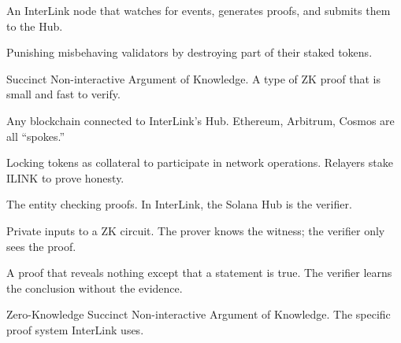 \documentclass[11pt,a4paper]{article}
\begin{document}
\begin{description}[style=nextline, leftmargin=3cm, labelwidth=2.8cm]
\item[Relayer] An InterLink node that watches for events, generates proofs, and submits them to the Hub.

\item[Slashing] Punishing misbehaving validators by destroying part of their staked tokens.

\item[SNARK] Succinct Non-interactive Argument of Knowledge. A type of ZK proof that is small and fast to verify.

\item[Spoke] Any blockchain connected to InterLink's Hub. Ethereum, Arbitrum, Cosmos are all ``spokes.''

\item[Staking] Locking tokens as collateral to participate in network operations. Relayers stake ILINK to prove honesty.

\item[Verifier] The entity checking proofs. In InterLink, the Solana Hub is the verifier.

\item[Witness] Private inputs to a ZK circuit. The prover knows the witness; the verifier only sees the proof.

\item[Zero-Knowledge] A proof that reveals nothing except that a statement is true. The verifier learns the conclusion without the evidence.

\item[zk-SNARK] Zero-Knowledge Succinct Non-interactive Argument of Knowledge. The specific proof system InterLink uses.

\end{description}

\newpage
\end{document}
